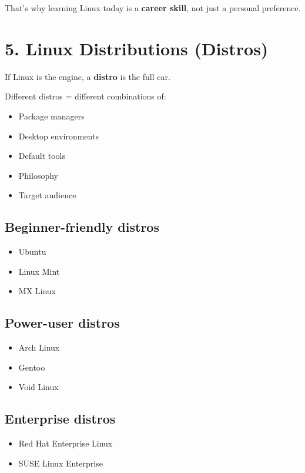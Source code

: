 \documentclass[12pt]{article}
\begin{document}
\begin{highlightbox}
That's why learning Linux today is a \textbf{career skill}, not just a personal preference.
\end{highlightbox}

\section*{5. Linux Distributions (Distros)}

If Linux is the engine, a \textbf{distro} is the full car.

Different distros = different combinations of:

\begin{itemize}
    \item Package managers
    \item Desktop environments
    \item Default tools
    \item Philosophy
    \item Target audience
\end{itemize}

\subsection*{Beginner-friendly distros}
\begin{itemize}
    \item Ubuntu
    \item Linux Mint
    \item MX Linux
\end{itemize}

\subsection*{Power-user distros}
\begin{itemize}
    \item Arch Linux
    \item Gentoo
    \item Void Linux
\end{itemize}

\subsection*{Enterprise distros}
\begin{itemize}
    \item Red Hat Enterprise Linux
    \item SUSE Linux Enterprise
\end{itemize}
\end{document}
